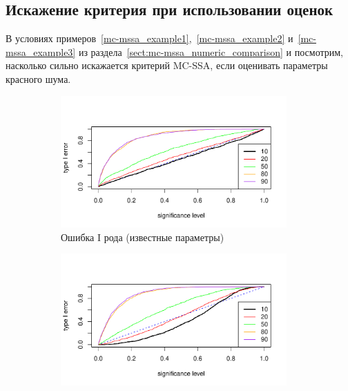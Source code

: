 \documentclass[specialist,
substylefile = spbu_report.rtx,
subf,href,colorlinks=true, 12pt]{disser}
\theoremstyle{definition}
\begin{document}
\subsection{Искажение критерия при использовании оценок}\label{sect:mc-ssa_est}
В условиях примеров~\ref{mc-mssa_example1},~\ref{mc-mssa_example2} и~\ref{mc-mssa_example3} из раздела~\ref{sect:mc-mssa_numeric_comparison} и посмотрим, насколько сильно искажается критерий MC-SSA, если оценивать параметры красного шума.


\begin{figure}[h!]
	\captionsetup[subfigure]{justification=Centering}
	\begin{subfigure}[t]{0.5\textwidth}
		\centering
		\includegraphics[width=0.95\textwidth]{img/type1error_phi7.pdf}
		\caption{Ошибка I рода (известные параметры)}
		\label{fig:type1error_phi7}
	\end{subfigure}\hspace{\fill}
	\begin{subfigure}[t]{0.5\textwidth}
		\centering
		\includegraphics[width=0.95\textwidth]{img/type1error_phi7est.pdf}

\end{subfigure}
\end{figure}
\end{document}
